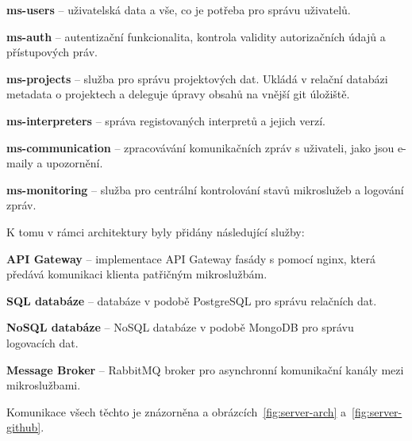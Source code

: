 \begin{ul}
   \item \textbf{ms-users} – uživatelská data a vše, co je potřeba pro správu uživatelů.
   \item \textbf{ms-auth} – autentizační funkcionalita, kontrola validity autorizačních údajů a přístupových práv.
   \item \textbf{ms-projects} – služba pro správu projektových dat.
   Ukládá v relační databázi metadata o projektech a deleguje úpravy obsahů na vnější git úložiště.
   \item \textbf{ms-interpreters} – správa registovaných interpretů a jejich verzí.
   \item \textbf{ms-communication} – zpracovávání komunikačních zpráv s uživateli, jako jsou e-maily a upozornění.
   \item \textbf{ms-monitoring} – služba pro centrální kontrolování stavů mikroslužeb a logování zpráv.
\end{ul}

K tomu v rámci architektury byly přidány následující služby:

\begin{ul}
   \item \textbf{API Gateway} – implementace API Gateway fasády s pomocí nginx, která předává komunikaci klienta patřičným mikroslužbám.
   \item \textbf{SQL databáze} –  databáze v podobě PostgreSQL pro správu relačních dat.
   \item \textbf{NoSQL databáze} – NoSQL databáze v podobě MongoDB pro správu logovacích dat.
   \item \textbf{Message Broker} – RabbitMQ broker pro asynchronní komunikační kanály mezi mikroslužbami.
\end{ul}

Komunikace všech těchto je znázorněna a obrázcích~\ref{fig:server-arch} a~\ref{fig:server-github}.

